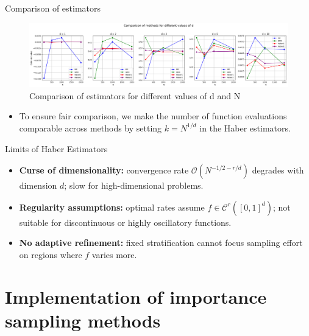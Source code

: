 \documentclass[aspectratio=169,xcolor=dvipsnames]{beamer}
\begin{document}
    \begin{frame}{Comparison of estimators}
        \begin{figure}
            \centering
            \includegraphics[width=1\linewidth]{graphs_haber.png}
            \caption{Comparison of estimators for different values of d and N}
            \label{fig:haber}
        \end{figure}

        \begin{itemize}
            \item To ensure fair comparison, we make the number of function evaluations comparable across methods by setting \( k = N^{1/d} \) in the Haber estimators.
        \end{itemize}
    \end{frame}

\begin{frame}{Limits of Haber Estimators}
    \begin{itemize}
        \item<1-> \textbf{Curse of dimensionality:} convergence rate \( \mathcal{O}(N^{-1/2 - r/d}) \) degrades with dimension \( d \); slow for high-dimensional problems.
        
        
        \item<2-> \textbf{Regularity assumptions:} optimal rates assume \( f \in \mathcal{C}^r([0,1]^d) \); not suitable for discontinuous or highly oscillatory functions.

        \item<3-> \textbf{No adaptive refinement:} fixed stratification cannot focus sampling effort on regions where \( f \) varies more.


    \end{itemize}
\end{frame}

    \section{Implementation of importance sampling methods}
\end{document}
